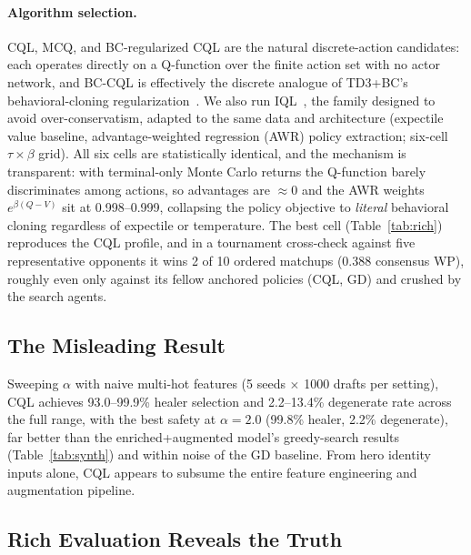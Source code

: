 \documentclass[journal]{IEEEtran}
\begin{document}
\paragraph{Algorithm selection.} CQL, MCQ, and BC-regularized CQL are the natural discrete-action candidates: each operates directly on a Q-function over the finite action set with no actor network, and BC-CQL is effectively the discrete analogue of TD3+BC's behavioral-cloning regularization~\cite{fujimoto2021minimalist}. We also run IQL~\cite{kostrikov2022iql}, the family designed to avoid over-conservatism, adapted to the same data and architecture (expectile value baseline, advantage-weighted regression (AWR) policy extraction; six-cell $\tau \times \beta$ grid). All six cells are statistically identical, and the mechanism is transparent: with terminal-only Monte Carlo returns the Q-function barely discriminates among actions, so advantages are $\approx 0$ and the AWR weights $e^{\beta(Q - V)}$ sit at 0.998--0.999, collapsing the policy objective to \textit{literal} behavioral cloning regardless of expectile or temperature. The best cell (Table~\ref{tab:rich}) reproduces the CQL profile, and in a tournament cross-check against five representative opponents it wins 2 of 10 ordered matchups (0.388 consensus WP), roughly even only against its fellow anchored policies (CQL, GD) and crushed by the search agents.

\subsection{The Misleading Result}

Sweeping $\alpha$ with naive multi-hot features (5 seeds $\times$ 1000 drafts per setting), CQL achieves 93.0--99.9\% healer selection and 2.2--13.4\% degenerate rate across the full range, with the best safety at $\alpha = 2.0$ (99.8\% healer, 2.2\% degenerate), far better than the enriched+augmented model's greedy-search results (Table~\ref{tab:synth}) and within noise of the GD baseline. From hero identity inputs alone, CQL appears to subsume the entire feature engineering and augmentation pipeline.

\subsection{Rich Evaluation Reveals the Truth}
\end{document}
